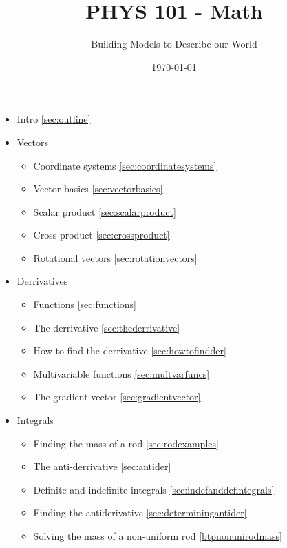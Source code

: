 \documentclass[aspectratio=169,
hyperref={colorlinks,urlcolor=blue}
]{beamer}
\title{PHYS 101 - Math}
\institute{}
\author{Building Models to Describe our World}
\date{\today}
\begin{document}
\begin{frame}
\titlepage
\thispagestyle{empty}
\end{frame}

{
\begin{itemize}
\item Intro \ref{sec:outline}
\vspace{1cm}
\item Vectors
\begin{itemize}
\item Coordinate systems \ref{sec:coordinatesystems}
\item Vector basics \ref{sec:vectorbasics}
\item Scalar product \ref{sec:scalarproduct}
\item Cross product \ref{sec:crossproduct}
\item Rotational vectors \ref{sec:rotationvectors}

\end{itemize}

\end{itemize}
}
{
\begin{itemize}
\item Derrivatives 
\begin{itemize}
\item Functions \ref{sec:functions}
\item The derrivative \ref{sec:thederrivative}
\item How to find the derrivative \ref{sec:howtofindder}
\item Multivariable functions \ref{sec:multvarfuncs}
\item The gradient vector \ref{sec:gradientvector}

\end{itemize}

\item Integrals

\begin{itemize}
\item Finding the mass of a rod \ref{sec:rodexamples}
\item The anti-derrivative \ref{sec:antider}
\item Definite and indefinite integrals \ref{sec:indefanddefintegrals}
\item Finding the antiderivative \ref{sec:determiningantider}
\item Solving the mass of a non-uniform rod \ref{btpnonunirodmass}
\end{itemize}


\end{itemize}
}
\end{document}
